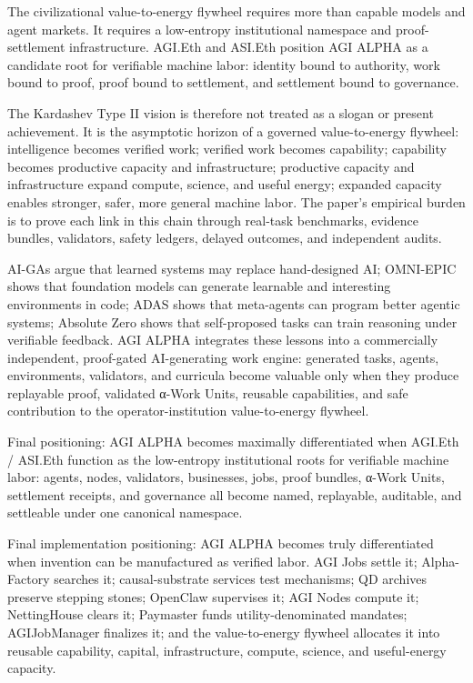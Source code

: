 The civilizational value-to-energy flywheel requires more than capable
models and agent markets. It requires a low-entropy institutional
namespace and proof-settlement infrastructure. AGI.Eth and ASI.Eth
position AGI ALPHA as a candidate root for verifiable machine labor:
identity bound to authority, work bound to proof, proof bound to
settlement, and settlement bound to governance.

The Kardashev Type II vision is therefore not treated as a slogan or
present achievement. It is the asymptotic horizon of a governed
value-to-energy flywheel: intelligence becomes verified work; verified
work becomes capability; capability becomes productive capacity and
infrastructure; productive capacity and infrastructure expand compute,
science, and useful energy; expanded capacity enables stronger, safer,
more general machine labor. The paper's empirical burden is to prove
each link in this chain through real-task benchmarks, evidence bundles,
validators, safety ledgers, delayed outcomes, and independent audits.

AI-GAs argue that learned systems may replace hand-designed AI;
OMNI-EPIC shows that foundation models can generate learnable and
interesting environments in code; ADAS shows that meta-agents can
program better agentic systems; Absolute Zero shows that self-proposed
tasks can train reasoning under verifiable feedback. AGI ALPHA
integrates these lessons into a commercially independent, proof-gated
AI-generating work engine: generated tasks, agents, environments,
validators, and curricula become valuable only when they produce
replayable proof, validated α-Work Units, reusable capabilities, and
safe contribution to the operator-institution value-to-energy flywheel.

Final positioning: AGI ALPHA becomes maximally differentiated when
AGI.Eth / ASI.Eth function as the low-entropy institutional roots for
verifiable machine labor: agents, nodes, validators, businesses, jobs,
proof bundles, α-Work Units, settlement receipts, and governance all
become named, replayable, auditable, and settleable under one canonical
namespace.

Final implementation positioning: AGI ALPHA becomes truly differentiated
when invention can be manufactured as verified labor. AGI Jobs settle
it; Alpha-Factory searches it; causal-substrate services test
mechanisms; QD archives preserve stepping stones; OpenClaw supervises
it; AGI Nodes compute it; NettingHouse clears it; Paymaster funds
utility-denominated mandates; AGIJobManager finalizes it; and the
value-to-energy flywheel allocates it into reusable capability, capital,
infrastructure, compute, science, and useful-energy capacity.

